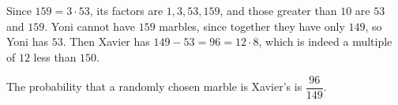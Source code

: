 Since $159=3\cdot53$, its factors are $1,3,53,159$, and those greater than $10$ are $53$ and $159$. Yoni cannot have $159$ marbles, since together they have only $149$, so Yoni has $53$. Then Xavier has $149-53=96=12\cdot8$, which is indeed a multiple of $12$ less than $150$.

The probability that a randomly chosen marble is Xavier's is $\boxed{\dfrac{96}{149}}$.
